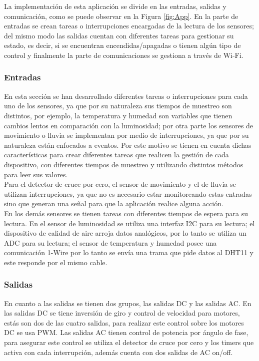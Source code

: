 La implementación de esta aplicación se divide en las entradas, salidas y comunicación, como se puede observar en la Figura \ref{fig:App}. En la parte de entradas se crean tareas o interrupciones encargadas de la lectura de los sensores; del mismo modo las salidas cuentan con diferentes tareas para gestionar su estado, es decir, si se encuentran encendidas/apagadas o tienen algún tipo de control y finalmente la parte de comunicaciones se gestiona a través de Wi-Fi.

\subsubsection*{Entradas}

En esta sección se han desarrollado diferentes tareas o interrupciones para cada uno de los sensores, ya que por su naturaleza sus tiempos de muestreo son distintos, por ejemplo, la temperatura y humedad son variables que tienen cambios lentos en comparación con la luminosidad; por otra parte los sensores de movimiento o lluvia se implementan por medio de interrupciones, ya que por su naturaleza están enfocados a eventos. Por este motivo se tienen en cuenta dichas características para crear diferentes tareas que realicen la gestión de cada dispositivo, con diferentes tiempos de muestreo y utilizando distintos métodos para leer sus valores.\\

Para el detector de cruce por cero, el sensor de movimiento y el de lluvia se utilizan interrupciones, ya que no es necesario estar monitoreando estas entradas sino que generan una señal para que la aplicación realice alguna acción.\\

En los demás sensores se tienen tareas con diferentes tiempos de espera para su lectura. En el sensor de luminosidad se utiliza una interfaz I2C para su lectura; el dispositivo de calidad de aire arroja datos analógicos, por lo tanto se utiliza un ADC para su lectura; el sensor de temperatura y humedad posee una comunicación 1-Wire por lo tanto se envía una trama que pide datos al DHT11 y este responde por el mismo cable.\\

\subsubsection*{Salidas}

En cuanto a las salidas se tienen dos grupos, las salidas DC y las salidas AC. En las salidas DC se tiene inversión de giro y control de velocidad para motores, estás son dos de las cuatro salidas, para realizar este control sobre los motores DC se usa PWM. Las salidas AC tienen control de potencia por ángulo de fase, para asegurar este control se utiliza el detector de cruce por cero y los timers que activa con cada interrupción, además cuenta con dos salidas de AC on/off.\\


